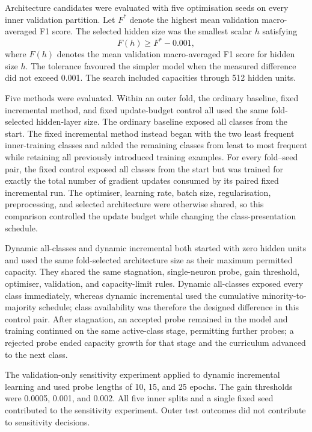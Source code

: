 \documentclass[conference,10pt]{IEEEtran}
\begin{document}
Architecture candidates were evaluated with five optimisation seeds on every inner validation partition. Let $F^{*}$ denote the highest mean validation macro-averaged F1 score. The selected hidden size was the smallest scalar $h$ satisfying
\begin{equation}
 F(h)\geq F^{*}-0.001,
\end{equation}
where $F(h)$ denotes the mean validation macro-averaged F1 score for hidden size $h$. The tolerance favoured the simpler model when the measured difference did not exceed 0.001. The search included capacities through 512 hidden units.

Five methods were evaluated. Within an outer fold, the ordinary baseline, fixed incremental method, and fixed update-budget control all used the same fold-selected hidden-layer size. The ordinary baseline exposed all classes from the start. The fixed incremental method instead began with the two least frequent inner-training classes and added the remaining classes from least to most frequent while retaining all previously introduced training examples. For every fold--seed pair, the fixed control exposed all classes from the start but was trained for exactly the total number of gradient updates consumed by its paired fixed incremental run. The optimiser, learning rate, batch size, regularisation, preprocessing, and selected architecture were otherwise shared, so this comparison controlled the update budget while changing the class-presentation schedule.

Dynamic all-classes and dynamic incremental both started with zero hidden units and used the same fold-selected architecture size as their maximum permitted capacity. They shared the same stagnation, single-neuron probe, gain threshold, optimiser, validation, and capacity-limit rules. Dynamic all-classes exposed every class immediately, whereas dynamic incremental used the cumulative minority-to-majority schedule; class availability was therefore the designed difference in this control pair. After stagnation, an accepted probe remained in the model and training continued on the same active-class stage, permitting further probes; a rejected probe ended capacity growth for that stage and the curriculum advanced to the next class.

The validation-only sensitivity experiment applied to dynamic incremental learning and used probe lengths of 10, 15, and 25 epochs. The gain thresholds were 0.0005, 0.001, and 0.002. All five inner splits and a single fixed seed contributed to the sensitivity experiment. Outer test outcomes did not contribute to sensitivity decisions.
\end{document}
